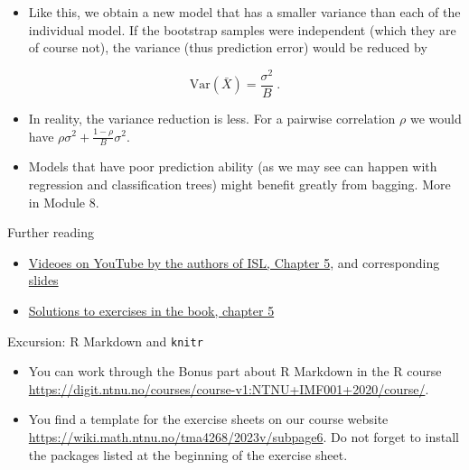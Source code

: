 \documentclass[
  10pt,
  ignorenonframetext,
]{beamer}
\providecommand{\tightlist}{%
  \setlength{\itemsep}{0pt}\setlength{\parskip}{0pt}}
\begin{document}
\begin{frame}
\begin{itemize}
\tightlist
\item
  Like this, we obtain a new model that has a smaller variance than each
  of the individual model. If the bootstrap samples were independent
  (which they are of course not), the variance (thus prediction error)
  would be reduced by
\end{itemize}

\[\text{Var}(\bar{X})=\frac{\sigma^2}{B} \ .\] \vspace{2mm}

\begin{itemize}
\tightlist
\item
  In reality, the variance reduction is less. For a pairwise correlation
  \(\rho\) we would have \(\rho\sigma^2 + \frac{1-\rho}{B}\sigma^2\).
\end{itemize}

\vspace{2mm}

\begin{itemize}
\tightlist
\item
  Models that have poor prediction ability (as we may see can happen
  with regression and classification trees) might benefit greatly from
  bagging. More in Module 8.
\end{itemize}
\end{frame}

\begin{frame}{Further reading}
\protect\hypertarget{further-reading}{}
\begin{itemize}
\tightlist
\item
  \href{https://www.youtube.com/playlist?list=PL5-da3qGB5IA6E6ZNXu7dp89_uv8yocmf}{Videoes
  on YouTube by the authors of ISL, Chapter 5}, and corresponding
  \href{https://lagunita.stanford.edu/c4x/HumanitiesScience/StatLearning/asset/cv_boot.pdf}{slides}
\item
  \href{https://rstudio-pubs-static.s3.amazonaws.com/65561_43c0eaaa8565414eae333b47038f716c.html}{Solutions
  to exercises in the book, chapter 5}
\end{itemize}
\end{frame}

\begin{frame}{Excursion: R Markdown and \texttt{knitr}}
\protect\hypertarget{excursion-r-markdown-and-knitr}{}
\begin{itemize}
\item
  You can work through the Bonus part about R Markdown in the R course
  \url{https://digit.ntnu.no/courses/course-v1:NTNU+IMF001+2020/course/}.
\item
  You find a template for the exercise sheets on our course website
  \url{https://wiki.math.ntnu.no/tma4268/2023v/subpage6}. Do not forget
  to install the packages listed at the beginning of the exercise sheet.
\end{itemize}
\end{frame}
\end{document}

